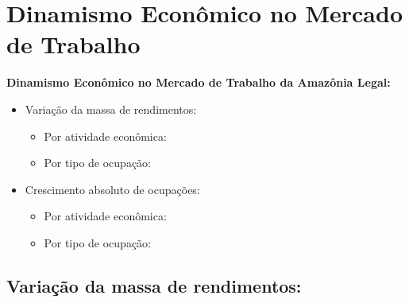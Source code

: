 \documentclass[8pt]{beamer}
\begin{document}
\begin{frame}[label=indice_principal]{}
\begin{itemize}
\end{itemize}

\end{frame}

\section{Dinamismo Econômico no Mercado de Trabalho}

\begin{frame}[label=indice_principal_amz]{}

\textit{\hyperlink{indice_principal}{}}

\textbf{Dinamismo Econômico no Mercado de Trabalho da Amazônia Legal:}
\vspace{2mm}
\begin{itemize}

\vspace{1mm}

\item{Variação da massa de rendimentos:
	\begin{itemize}
	\item{Por atividade econômica: \hyperlink{rkngvmassaporcnae2dig}{}}
	\item{Por tipo de ocupação: \hyperlink{rkngvmassaporcod2dig}{}}
	\end{itemize}
}
\vspace{1mm}

\item{Crescimento  absoluto de ocupações:
	\begin{itemize}
	\item{Por atividade econômica: \hyperlink{rkngnocuporcnae2dig}{}}
	\item{Por tipo de ocupação: \hyperlink{rkngnocuporcod2dig}{}}
	\end{itemize}
}
\vspace{1mm}

\end{itemize}

\end{frame}

\subsection{Variação da massa de rendimentos:}

\begin{frame}
\textit{\hyperlink{indice_principal_amz}{}}

\end{frame}
\end{document}
